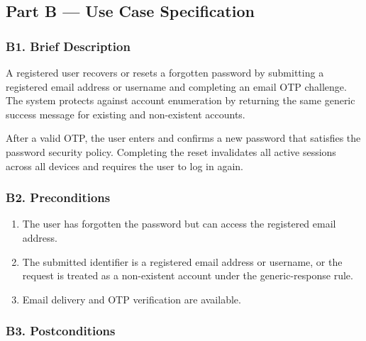 \documentclass[12pt]{article}
\begin{document}
\subsection*{Part B --- Use Case Specification}
\par\medskip

\hypertarget{sec:b1-brief-description}{}
\subsubsection*{B1. Brief Description}
\par\medskip

A registered user recovers or resets a forgotten password by submitting a registered email address or username and completing an email OTP challenge. The system protects against account enumeration by returning the same generic success message for existing and non-existent accounts.
\par\medskip

After a valid OTP, the user enters and confirms a new password that satisfies the password security policy. Completing the reset invalidates all active sessions across all devices and requires the user to log in again.
\par\medskip

\hypertarget{sec:b2-preconditions}{}
\subsubsection*{B2. Preconditions}
\par\medskip

\begin{enumerate}
\item The user has forgotten the password but can access the registered email address.
\item The submitted identifier is a registered email address or username, or the request is treated as a non-existent account under the generic-response rule.
\item Email delivery and OTP verification are available.
\end{enumerate}
\par\medskip

\hypertarget{sec:b3-postconditions}{}
\subsubsection*{B3. Postconditions}
\par\medskip
\end{document}

